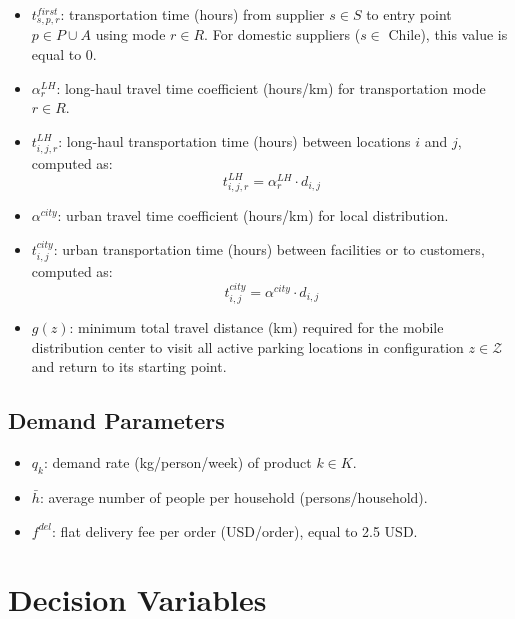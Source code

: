 \documentclass[12pt]{article}
\begin{document}
\begin{itemize}

    \item $t^{first}_{s,p,r}$: transportation time (hours) from supplier $s \in S$ to entry point $p \in P \cup A$ using mode $r \in R$. 
    For domestic suppliers ($s \in$ Chile), this value is equal to 0.

    \item $\alpha^{LH}_{r}$: long-haul travel time coefficient (hours/km) for transportation mode $r \in R$.

    \item $t^{LH}_{i,j,r}$: long-haul transportation time (hours) between locations $i$ and $j$, computed as:
    \[
    t^{LH}_{i,j,r} = \alpha^{LH}_{r} \cdot d_{i,j}
    \]

    \item $\alpha^{city}$: urban travel time coefficient (hours/km) for local distribution.

    \item $t^{city}_{i,j}$: urban transportation time (hours) between facilities or to customers, computed as:
    \[
    t^{city}_{i,j} = \alpha^{city} \cdot d_{i,j}
    \]

    \item $g(z)$: minimum total travel distance (km) required for the mobile distribution center to visit all active parking locations in configuration $z \in \mathcal{Z}$ and return to its starting point.

\end{itemize}

\subsection{Demand Parameters}

\begin{itemize}
    \item $q_k$: demand rate (kg/person/week) of product $k \in K$.
    
    \item $\bar{h}$: average number of people per household (persons/household).
    
    \item $f^{del}$: flat delivery fee per order (USD/order), equal to 2.5 USD.
\end{itemize}
\newpage

\section{Decision Variables}
\end{document}
